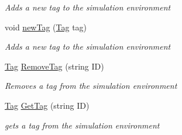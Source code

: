 \begin{DoxyCompactItemize}
\begin{DoxyCompactList}\small\item\em Adds a new tag to the simulation environment \end{DoxyCompactList}\item 
void \hyperlink{class_pozyx_positioner_1_1_framework_1_1_sim_environment_ae804be21b53900cbac13c0cce385b170}{new\+Tag} (\hyperlink{class_pozyx_positioner_1_1_framework_1_1_tag}{Tag} tag)
\begin{DoxyCompactList}\small\item\em Adds a new tag to the simulation environment \end{DoxyCompactList}\item 
\hyperlink{class_pozyx_positioner_1_1_framework_1_1_tag}{Tag} \hyperlink{class_pozyx_positioner_1_1_framework_1_1_sim_environment_aa69448aa9bc85a646b57b753f5c5e483}{Remove\+Tag} (string ID)
\begin{DoxyCompactList}\small\item\em Removes a tag from the simulation environment \end{DoxyCompactList}\item 
\hyperlink{class_pozyx_positioner_1_1_framework_1_1_tag}{Tag} \hyperlink{class_pozyx_positioner_1_1_framework_1_1_sim_environment_a2163b3c6c4794224ceba0e5279b7ee8e}{Get\+Tag} (string ID)
\begin{DoxyCompactList}\small\item\em gets a tag from the simulation environment \end{DoxyCompactList}\end{DoxyCompactItemize}
